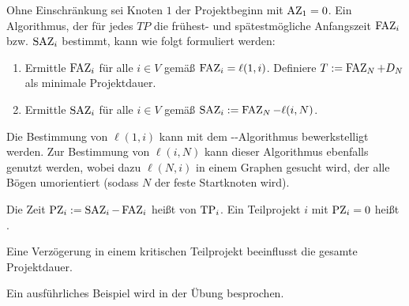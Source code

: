 Ohne Einschränkung sei Knoten $1$ der Projektbeginn mit $\operatorname{AZ}_1 = 0$. Ein Algorithmus, der für jedes $TP$ die frühest- und spätestmögliche Anfangszeit $\operatorname{FAZ}_i$ bzw. $\operatorname{SAZ}_i$ bestimmt, kann wie folgt formuliert werden:

\begin{enumerate}[label=Schritt \arabic*:, leftmargin=*, start=1]
	\item Ermittle $\operatorname{FAZ}_i$ für alle $i \in V$ gemäß $\operatorname{FAZ}_i = \ell(1,i)$. Definiere $T \mathrel{:=} \operatorname{FAZ}_N + D_N$ als minimale Projektdauer.
	\item Ermittle $\operatorname{SAZ}_i$ für alle $i \in V$ gemäß $\operatorname{SAZ}_i \mathrel{:=} \operatorname{FAZ}_N - \ell(i,N)$.
\end{enumerate}

Die Bestimmung von $\ell(1,i)$ kann mit dem --Algorithmus bewerkstelligt werden. Zur Bestimmung von $\ell(i,N)$ kann dieser Algorithmus ebenfalls genutzt werden, wobei dazu $\ell(N,i)$ in einem Graphen gesucht wird, der alle Bögen umorientiert (sodass $N$ der feste Startknoten wird).

\begin{definition}
	Die Zeit $\operatorname{PZ}_i \mathrel{:=} \operatorname{SAZ}_i - \operatorname{FAZ}_i$ heißt  von $\operatorname{TP}_i$. Ein Teilprojekt $i$ mit $\operatorname{PZ}_i = 0$ heißt .
\end{definition}

Eine Verzögerung in einem kritischen Teilprojekt beeinflusst die gesamte Projektdauer.

Ein ausführliches Beispiel wird in der Übung besprochen.
